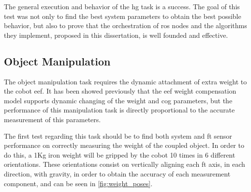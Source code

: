 \par The general execution and behavior of the \ac{hg} task is a success. The goal of this test was not only to find the best system parameters to obtain the best possible behavior, but also to prove that the orchestration of \ac{ros} nodes and the algorithms they implement, proposed in this dissertation, is well founded and effective.



\subsection{Object Manipulation}

\par The object manipulation task requires the dynamic attachment of extra weight to the cobot \ac{eef}. It has been showed previously that the \ac{eef} weight compensation model supports dynamic changing of the weight and \ac{cog} parameters, but the performance of this manipulation task is directly proportional to the accurate measurement of this parameters.

\par The first test regarding this task should be to find both system and \ac{ft} sensor performance on correctly measuring the weight of the coupled object. In order to do this, a 1Kg iron weight will be gripped by the cobot 10 times in 6 different orientations. These orientations consist on vertically aligning each \ac{ft} axis, in each direction, with gravity, in order to obtain the accuracy of each measurement component, and can be seen in \autoref{fig:weight_poses}.

